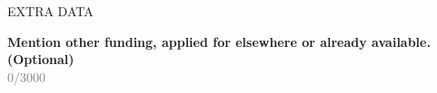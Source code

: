 \documentclass[11pt,dvipsnames,usenames,a4paper]{article}
\begin{document}

\vspace{10pt}

\begin{shaded}\centering EXTRA DATA \end{shaded}

\textbf{Mention other funding, applied for elsewhere or already available. (Optional)}\\
\textcolor{Gray}{0/3000}\\



\end{document}
